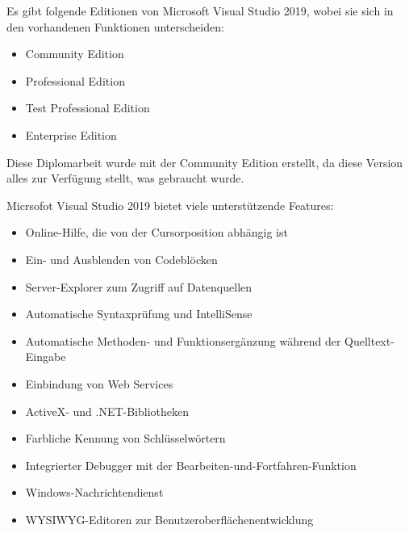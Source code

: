 Es gibt folgende Editionen von Microsoft Visual Studio 2019, wobei sie sich in den vorhandenen Funktionen unterscheiden:
\begin{itemize}
	\item Community Edition
	\item Professional Edition
	\item Test Professional Edition
	\item Enterprise Edition
\end{itemize}

Diese Diplomarbeit wurde mit der Community Edition erstellt, da diese Version alles zur Verfügung stellt, was gebraucht wurde. \autocite{wikiVisualStudio}

Micrsofot Visual Studio 2019 bietet viele unterstützende Features:
\begin{itemize}
	\item Online-Hilfe, die von der Cursorposition abhängig ist
	\item Ein- und Ausblenden von Codeblöcken
	\item Server-Explorer zum Zugriff auf Datenquellen
	\item Automatische Syntaxprüfung und IntelliSense
	\item Automatische Methoden- und Funktionsergänzung während der Quelltext-Eingabe
	\item Einbindung von Web Services
	\item ActiveX- und .NET-Bibliotheken
    \item Farbliche Kennung von Schlüsselwörtern
    \item Integrierter Debugger mit der Bearbeiten-und-Fortfahren-Funktion
	\item Windows-Nachrichtendienst
	\item WYSIWYG-Editoren zur Benutzeroberflächenentwicklung
\end{itemize}

